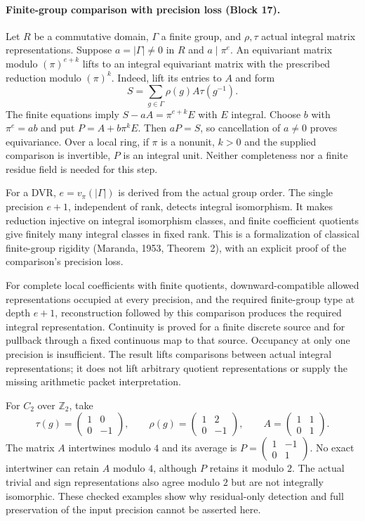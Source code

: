 \documentclass[11pt]{article}
\theoremstyle{definition}
\theoremstyle{remark}
\begin{document}
\paragraph{Finite-group comparison with precision loss (Block 17).}
Let $R$ be a commutative domain, $\Gamma$ a finite group, and $\rho,\tau$
actual integral matrix representations. Suppose $a=|\Gamma|\ne0$ in $R$ and
$a\mid\pi^e$. An equivariant matrix modulo $(\pi)^{e+k}$ lifts to an
integral equivariant matrix with the prescribed reduction modulo $(\pi)^k$.
Indeed, lift its entries to $A$ and form
\[
S=\sum_{g\in\Gamma}\rho(g)A\tau(g^{-1}).
\]
The finite equations imply $S-aA=\pi^{e+k}E$ with $E$ integral. Choose $b$
with $\pi^e=ab$ and put $P=A+b\pi^kE$. Then $aP=S$, so cancellation of
$a\ne0$ proves equivariance. Over a local ring, if $\pi$ is a nonunit,
$k>0$ and the supplied comparison is invertible, $P$ is an integral unit.
Neither completeness nor a finite residue field is needed for this step.

For a DVR, $e=v_\pi(|\Gamma|)$ is derived from the actual group order.
The single precision $e+1$, independent of rank, detects integral
isomorphism. It makes reduction injective on integral isomorphism classes,
and finite coefficient quotients give finitely many integral classes in
fixed rank. This is a formalization of classical finite-group rigidity
(Maranda, 1953, Theorem~2), with an explicit proof of the comparison's
precision loss.

For complete local coefficients with finite quotients, downward-compatible
allowed representations occupied at every precision, and the required
finite-group type at depth $e+1$, reconstruction followed by this comparison
produces the required integral representation. Continuity is proved for a
finite discrete source and for pullback through a fixed continuous map to
that source. Occupancy at only one precision is insufficient. The result
lifts comparisons between actual integral representations; it does not lift
arbitrary quotient representations or supply the missing arithmetic packet
interpretation.

For $C_2$ over $\mathbb Z_2$, take
\[
\tau(g)=\begin{pmatrix}1&0\\0&-1\end{pmatrix},\qquad
\rho(g)=\begin{pmatrix}1&2\\0&-1\end{pmatrix},\qquad
A=\begin{pmatrix}1&1\\0&1\end{pmatrix}.
\]
The matrix $A$ intertwines modulo $4$ and its average is
$P=\left(\begin{smallmatrix}1&-1\\0&1\end{smallmatrix}\right)$.
No exact intertwiner can retain $A$ modulo $4$, although $P$ retains it
modulo $2$. The actual trivial and sign representations also agree modulo
$2$ but are not integrally isomorphic. These checked examples show why
residual-only detection and full preservation of the input precision cannot
be asserted here.
\end{document}
